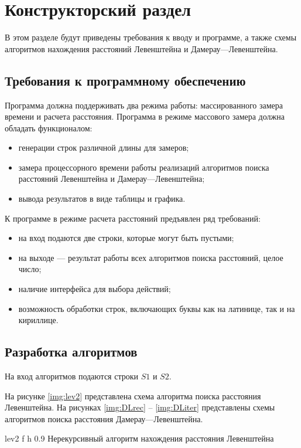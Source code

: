 \chapter{Конструкторский раздел}


В этом разделе будут приведены требования к вводу и программе, а также схемы алгоритмов нахождения расстояний Левенштейна и Дамерау---Левенштейна.

\section{Требования к программному обеспечению}
Программа должна поддерживать два режима работы: массированного замера времени и расчета расстояния. 
Программа в режиме массового замера должна обладать функционалом:
\begin{itemize}
	\item генерации строк различной длины для замеров;
	\item замера процессорного времени работы реализаций алгоритмов поиска расстояний Левенштейна и Дамерау---Левенштейна;
	\item вывода результатов в виде таблицы и графика.
\end{itemize}

К программе в режиме расчета расстояний предъявлен ряд требований:
\begin{itemize}
	\item на вход подаются две строки, которые могут быть пустыми;
	\item на выходе --- результат работы всех алгоритмов поиска расстояний, целое число;
	\item наличие интерфейса для выбора действий;
	\item возможность обработки строк, включающих буквы как на латинице, так и на кириллице.
\end{itemize}


\section{Разработка алгоритмов}

На вход алгоритмов подаются строки $S1$ и $S2$.

На рисунке \ref{img:lev2} представлена схема алгоритма поиска расстояния Левенштейна. На рисунках \ref{img:DLrec} -- \ref{img:DLiter} представлены схемы алгоритмов поиска расстояния Дамерау---Левенштейна.

{lev2} %
{f} %
{h} %
{0.9\textwidth} %
{Нерекурсивный алгоритм нахождения расстояния Левенштейна} %

